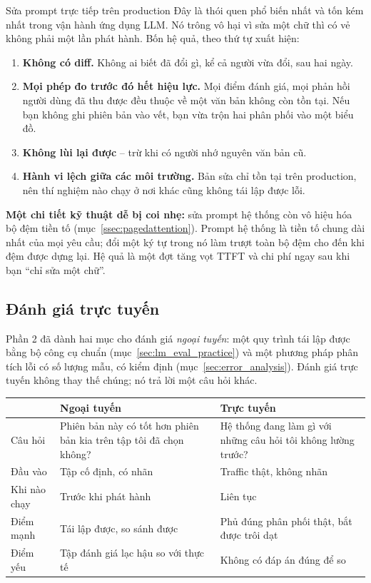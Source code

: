 \begin{pitfall}{Sửa prompt trực tiếp trên production}
Đây là thói quen phổ biến nhất và tốn kém nhất trong vận hành ứng dụng LLM. Nó trông vô hại vì sửa một chữ thì có vẻ không phải một lần phát hành. Bốn hệ quả, theo thứ tự xuất hiện:

\begin{enumerate}
	\item \textbf{Không có diff.} Không ai biết đã đổi gì, kể cả người vừa đổi, sau hai ngày.
	\item \textbf{Mọi phép đo trước đó hết hiệu lực.} Mọi điểm đánh giá, mọi phản hồi người dùng đã thu được đều thuộc về một văn bản không còn tồn tại. Nếu bạn không ghi phiên bản vào vết, bạn vừa trộn hai phân phối vào một biểu đồ.
	\item \textbf{Không lùi lại được} -- trừ khi có người nhớ nguyên văn bản cũ.
	\item \textbf{Hành vi lệch giữa các môi trường.} Bản sửa chỉ tồn tại trên production, nên thí nghiệm nào chạy ở nơi khác cũng không tái lập được lỗi.
\end{enumerate}

\textbf{Một chi tiết kỹ thuật dễ bị coi nhẹ:} sửa prompt hệ thống còn vô hiệu hóa bộ đệm tiền tố (mục~\ref{ssec:pagedattention}). Prompt hệ thống là tiền tố chung dài nhất của mọi yêu cầu; đổi một ký tự trong nó làm trượt toàn bộ đệm cho đến khi đệm được dựng lại. Hệ quả là một đợt tăng vọt TTFT và chi phí ngay sau khi bạn ``chỉ sửa một chữ''.
\end{pitfall}

\subsection{Đánh giá trực tuyến}
\label{ssec:online_eval}

Phần 2 đã dành hai mục cho đánh giá \emph{ngoại tuyến}: một quy trình tái lập được bằng bộ công cụ chuẩn (mục~\ref{sec:lm_eval_practice}) và một phương pháp phân tích lỗi có số lượng mẫu, có kiểm định (mục~\ref{sec:error_analysis}). Đánh giá trực tuyến không thay thế chúng; nó trả lời một câu hỏi khác.

\begin{center}
\small
\begin{tabular}{@{}p{3.1cm}p{5.1cm}p{5.1cm}@{}}
\toprule
 & \textbf{Ngoại tuyến} & \textbf{Trực tuyến} \\
\midrule
Câu hỏi & Phiên bản này có tốt hơn phiên bản kia trên tập tôi đã chọn không? & Hệ thống đang làm gì với những câu hỏi tôi không lường trước? \\
Đầu vào & Tập cố định, có nhãn & Traffic thật, không nhãn \\
Khi nào chạy & Trước khi phát hành & Liên tục \\
Điểm mạnh & Tái lập được, so sánh được & Phủ đúng phân phối thật, bắt được trôi dạt \\
Điểm yếu & Tập đánh giá lạc hậu so với thực tế & Không có đáp án đúng để so \\
\bottomrule
\end{tabular}
\end{center}

